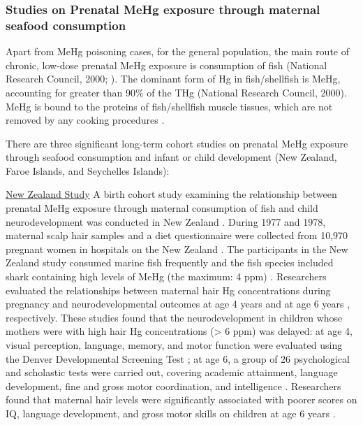 \subsubsection{Studies on Prenatal MeHg exposure through maternal seafood consumption}

Apart from MeHg poisoning cases, for the general population, the main route of chronic, low-dose prenatal MeHg exposure is consumption of fish (National Research Council, 2000; \cite{smith2005fish}). The dominant form of Hg in fish/shellfish is MeHg, accounting for greater than 90\% of the THg (National Research Council, 2000). MeHg is bound to the proteins of fish/shellfish muscle tissues, which are not removed by any cooking procedures \cite{mergler2007methylmercury}. 

There are three significant long-term cohort studies on prenatal MeHg exposure through seafood consumption and infant or child development (New Zealand, Faroe Islands, and Seychelles Islands): 

\underline{New Zealand Study} A birth cohort study examining the relationship between prenatal MeHg exposure through maternal consumption of fish and child neurodevelopment was conducted in New Zealand \cite{kjellstrom1986physical,kjellstrom1989physical,crump1998influence}. During 1977 and 1978, maternal scalp hair samples and a diet questionnaire were collected from 10,970 pregnant women in hospitals on the New Zealand \cite{crump1998influence}. The participants in the New Zealand study consumed marine fish frequently and the fish species included shark containing high levels of MeHg (the maximum: 4 ppm) \cite{clarkson2006toxicology}. Researchers evaluated the relationships between maternal hair Hg concentrations during pregnancy and neurodevelopmental outcomes at age 4 years \cite{kjellstrom1986physical} and at age 6 years \cite{kjellstrom1989physical}, respectively. These studies found that the neurodevelopment in children whose mothers were with high hair Hg concentrations (> 6 ppm) was delayed: at age 4, visual perception, language, memory, and motor function were evaluated using the Denver Developmental Screening Test \cite{kjellstrom1986physical}; at age 6, a group of 26 psychological and scholastic tests were carried out, covering academic attainment, language development, fine and gross motor coordination, and intelligence \cite{kjellstrom1989physical,crump1998influence}. Researchers found that maternal hair levels were significantly associated with poorer scores on IQ, language development, and gross motor skills on children at age 6 years \cite{kjellstrom1989physical}.

